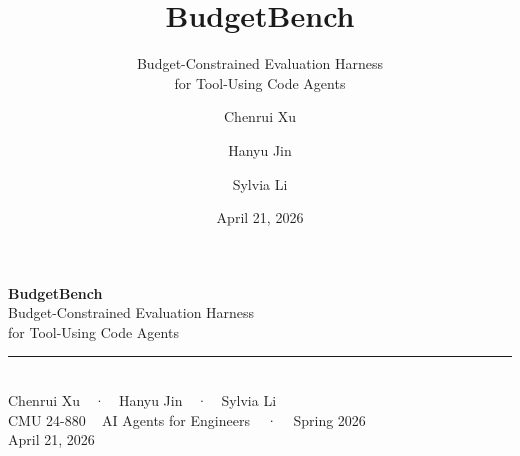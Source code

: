 \documentclass[aspectratio=169, 12pt]{beamer}
\title{\textbf{BudgetBench}}
\subtitle{Budget-Constrained Evaluation Harness\\for Tool-Using Code Agents}
\author{Chenrui Xu \and Hanyu Jin \and Sylvia Li}
\institute{CMU 24-880 ~ AI Agents for Engineers ~ Spring 2026}
\date{April 21, 2026}
\begin{document}
{
\begin{frame}[plain]
  \vspace{1.5cm}
  {\Huge\color{white}\textbf{BudgetBench}}\\[0.4cm]
  {\large\color{accent!60!white}Budget-Constrained Evaluation Harness\\for Tool-Using Code Agents}\\[0.8cm]
  {\color{accent!40!white}\rule{3cm}{0.5pt}}\\[0.4cm]
  {\color{white}Chenrui Xu~~·~~Hanyu Jin~~·~~Sylvia Li}\\[0.2cm]
  {\small\color{gray}CMU 24-880 ~ AI Agents for Engineers ~ · ~ Spring 2026}\\
  {\small\color{gray}April 21, 2026}
\end{frame}
}
\end{document}
